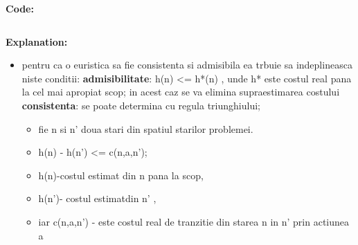\textbf{Code:}

\inputminted[linenos]{python}{code/06_consistent_heuristic.py}


\textbf{Explanation:}
\begin{itemize}
    \setlength\itemsep{0em}
    \item pentru ca o euristica sa fie consistenta si admisibila ea trbuie sa indeplineasca niste conditii:\newline
    \textbf{admisibilitate}: h(n) <= h*(n) , unde h* este costul real pana la cel mai apropiat scop; in acest caz se va elimina supraestimarea costului \newline
    \textbf{consistenta}: se poate determina cu regula triunghiului; 
    \begin{itemize}
    \setlength\itemsep{0em}
    \item fie n si n' doua stari din spatiul starilor problemei. 
    \item h(n) - h(n') <= c(n,a,n');
    \item h(n)-costul estimat din n pana la scop, 
    \item h(n')- costul estimatdin n' , 
    \item iar c(n,a,n') - este costul real de tranzitie din starea n in n' prin actiunea a
    \end{itemize}
    

\end{itemize}
